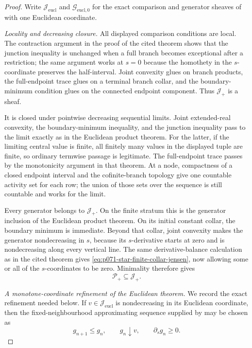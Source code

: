 \begin{proof}
Write $\mathcal J_{\mathrm{eucl}}$ and
$\mathcal G_{\mathrm{eucl},0}$ for the exact comparison and generator
sheaves of
 with one Euclidean
coordinate.

\medskip\noindent
\emph{Locality and decreasing closure.}
All displayed comparison conditions are local.  The contraction argument
in the proof of the cited theorem shows that the junction inequality is
unchanged when a full branch becomes exceptional after a restriction; the
same argument works at $s=0$ because the homothety in the $s$-coordinate
preserves the half-interval.  Joint convexity glues on branch products, the
full-endpoint trace glues on a terminal branch collar, and the
boundary-minimum condition glues on the connected endpoint component.
Thus $\mathcal J_+$ is a sheaf.

It is closed under pointwise decreasing sequential limits.  Joint
extended-real convexity, the boundary-minimum inequality, and the junction
inequality pass to the limit exactly as in the Euclidean product theorem.
For the latter, if the limiting central value is finite, all finitely many
values in the displayed tuple are finite, so ordinary termwise passage is
legitimate.  The full-endpoint trace passes by the monotonicity argument in
that theorem.  At a node, compactness of a closed endpoint interval and the
cofinite-branch topology give one countable activity set for each row; the
union of those sets over the sequence is still countable and works for the
limit.

Every generator belongs to $\mathcal J_+$.  On the finite stratum this is
the generator inclusion of the Euclidean product theorem.  On its initial
constant collar, the boundary minimum is immediate.  Beyond that collar,
joint convexity makes the generator nondecreasing in $s$, because its
$s$-derivative starts at zero and is nondecreasing along every vertical
line.  The same derivative-balance calculation as in the cited theorem
gives \eqref{eq:p071-star-finite-collar-jensen}, now allowing some or all
of the $s$-coordinates to be zero.  Minimality therefore gives
\begin{equation}
                         \mathcal P_+\subseteq\mathcal J_+.
\label{eq:p071-star-finite-collar-minimality}
\end{equation}

\medskip\noindent
\emph{A monotone-coordinate refinement of the Euclidean theorem.}
We record the exact refinement needed below.  If
$v\in\mathcal J_{\mathrm{eucl}}$ is nondecreasing in its Euclidean
coordinate, then the fixed-neighbourhood approximating sequence supplied
by  may be chosen as
\begin{equation}
             g_{n+1}\leq g_n,\qquad g_n\downarrow v,
             \qquad \partial_s g_n\geq0.
\label{eq:p071-star-finite-collar-monotone-refinement}
\end{equation}


\end{proof}
